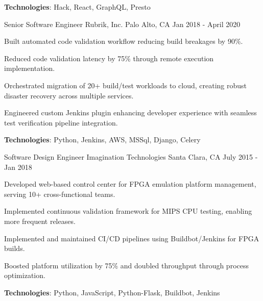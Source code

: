\begin{cventries}
{\begin{cvitems}
        \item {\textbf{Technologies}: Hack, React, GraphQL, Presto}
      \end{cvitems}
    }
    {}
    {}
  \cventry
    {Senior Software Engineer}
    {Rubrik, Inc.}
    {Palo Alto, CA}
    {Jan 2018 - April 2020}
    {
      \begin{cvitems}
        \item {Built automated code validation workflow reducing build breakages by 90\%.}
        \item {Reduced code validation latency by 75\% through remote execution implementation.}
        \item {Orchestrated migration of 20+ build/test workloads to cloud, creating robust disaster recovery across multiple services.}
        \item {Engineered custom Jenkins plugin enhancing developer experience with seamless test verification pipeline integration.}
        \item {\textbf{Technologies}: Python, Jenkins, AWS, MSSql, Django, Celery}
      \end{cvitems}
    }
    {}
    {}
  \cventry
    {Software Design Engineer}
    {Imagination Technologies}
    {Santa Clara, CA}
    {July 2015 - Jan 2018}
    {
      \begin{cvitems}
        \item {Developed web-based control center for FPGA emulation platform management, serving 10+ cross-functional teams.}
        \item {Implemented continuous validation framework for MIPS CPU testing, enabling more frequent releases.}                
        \item {Implemented and maintained CI/CD pipelines using Buildbot/Jenkins for FPGA builds.}
        \item {Boosted platform utilization by 75\% and doubled throughput through process optimization.}
        \item {\textbf{Technologies}: Python, JavaScript, Python-Flask, Buildbot, Jenkins}
      \end{cvitems}
    }
    {}
    {}

\end{cventries}
